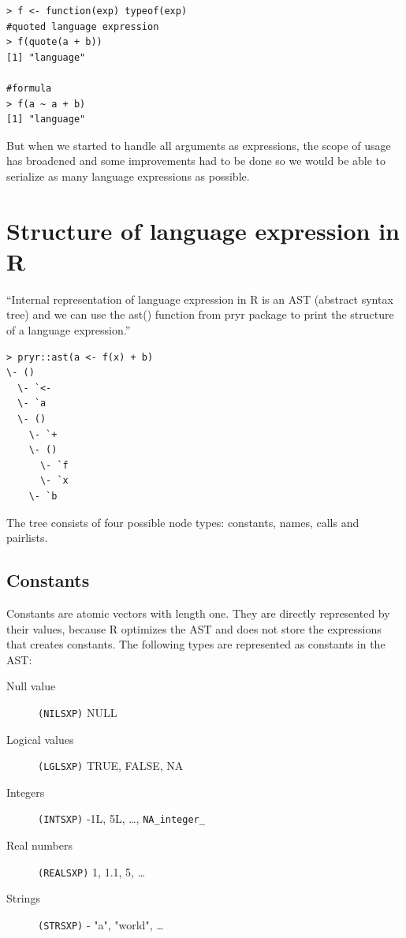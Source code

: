 \documentclass[thesis=B,english]{FITthesis}[2012/10/20]
\begin{document}
\begin{verbatim}
> f <- function(exp) typeof(exp)
#quoted language expression
> f(quote(a + b))
[1] "language"

#formula
> f(a ~ a + b)
[1] "language"
\end{verbatim}

But when we started to handle all arguments as expressions, the scope of usage has broadened and some improvements had to be done so we would be able to serialize as many language expressions as possible.

\section{Structure of language expression in R}
``Internal representation of language expression in R is an AST (abstract syntax tree) and we can use the ast() function from pryr package to print the structure of a language expression.'' \cite{advR}

\begin{minipage}{\linewidth}
\begin{verbatim}
> pryr::ast(a <- f(x) + b)
\- ()
  \- `<-
  \- `a
  \- ()
    \- `+
    \- ()
      \- `f
      \- `x
    \- `b
\end{verbatim}
\end{minipage}

The tree consists of four possible node types: constants, names, calls and pairlists.

\subsection{Constants}
Constants are atomic vectors with length one. They are directly represented by their values, because R optimizes the AST and does not store the expressions that creates constants. The following types are represented as constants in the AST:

\begin{description}
	\item[Null value] \verb|(NILSXP)| NULL
	\item[Logical values] \verb|(LGLSXP)| TRUE, FALSE, NA
	\item[Integers] \verb|(INTSXP)| -1L, 5L, \ldots, \verb|NA_integer_|
	\item[Real numbers] \verb|(REALSXP)| 1, 1.1, 5, \ldots
	\item[Strings] \verb|(STRSXP)| - "a", "world", \ldots

\end{description}
\end{document}
